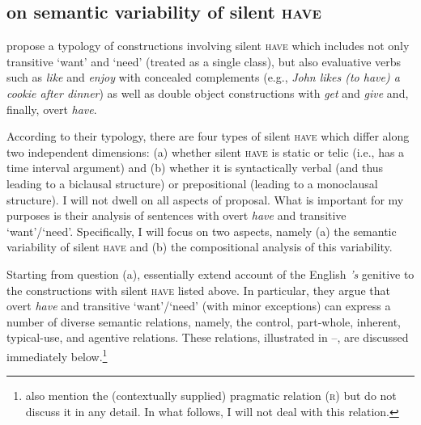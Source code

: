 \documentclass[output=paper,colorlinks,citecolor=brown]{langscibook}
\begin{document}
\subsection{\citeauthor{Zaroukian.Beller2013} on semantic variability of silent \textsc{have}}\label{section-zaroukian}

\citet{Zaroukian.Beller2013} propose a typology of constructions involving silent \textsc{have} which includes not only transitive `want' and `need' (treated as a single class), but also evaluative verbs such as \textit{like} and \textit{enjoy} with concealed complements (e.g., \textit{John likes (to have) a cookie after dinner}) as well as double object constructions with \textit{get} and \textit{give} and, finally, overt \textit{have}.

According to their typology, there are four types of silent \textsc{have} which differ along two independent dimensions: (a) whether silent \textsc{have} is static or telic (i.e., has a time interval argument) and (b) whether it is syntactically verbal (and thus leading to a biclausal structure) or prepositional (leading to a monoclausal structure). I will not dwell on all aspects of  proposal. What is important for my purposes is their analysis of sentences with overt \textit{have} and transitive `want'/`need'. Specifically, I will focus on two aspects, namely (a) the semantic variability of silent \textsc{have} and (b) the compositional analysis of this variability.

Starting from question (a), \citet{Zaroukian.Beller2013} essentially extend  account of the English \textit{'s} genitive to the constructions with silent \textsc{have} listed above. In particular, they argue that overt \textit{have} and transitive `want'/`need' (with minor exceptions) can express a number of diverse semantic relations, namely, the control, part-whole, inherent, typical-use, and agentive relations. These relations, illustrated in --, are discussed immediately below.\footnote{\citeauthor{Zaroukian.Beller2013} also mention the (contextually supplied) pragmatic relation (\textsc{r}) but do not discuss it in any detail. In what follows, I will not deal with this relation.}
\end{document}

